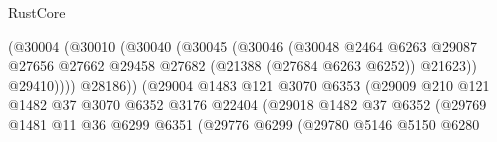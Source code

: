 \begin{lexlean}{RustCore}
\begin{coremodule}
                                            (@30004
                                              (@30010
                                                (@30040
                                                  (@30045
                                                    (@30046
                                                      (@30048
                                                        @2464
                                                        @6263
                                                        @29087
                                                        @27656
                                                        @27662
                                                        @29458
                                                        @27682
                                                        (@21388 (@27684 @6263 @6252))
                                                        @21623))
                                                    @29410))))
                                            @28186))
                                        (@29004
                                          @1483
                                          @121
                                          @3070
                                          @6353
                                          (@29009
                                            @210
                                            @121
                                            @1482
                                            @37
                                            @3070
                                            @6352
                                            @3176
                                            @22404
                                            (@29018
                                              @1482
                                              @37
                                              @6352
                                              (@29769
                                                @1481
                                                @11
                                                @36
                                                @6299
                                                @6351
                                                (@29776
                                                  @6299
                                                  (@29780
                                                    @5146
                                                    @5150
                                                    @6280

\end{coremodule}
\end{lexlean}
